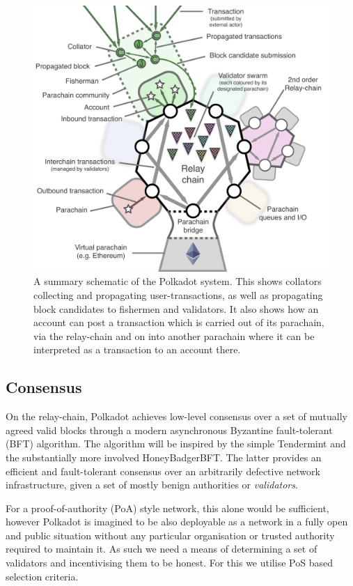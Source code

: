 \documentclass[9pt,oneside]{amsart}
\begin{document}
\begin{multicols}{2}
\begin{figure}
\includegraphics[width=12cm]{Overall.pdf}
\caption{A summary schematic of the Polkadot system. This shows collators collecting and propagating user-transactions, as well as propagating block candidates to fishermen and validators. It also shows how an account can post a transaction which is carried out of its parachain, via the relay-chain and on into another parachain where it can be interpreted as a transaction to an account there.}
\end{figure}

\subsection{Consensus}\label{consensus}

 On the relay-chain, Polkadot achieves low-level consensus over a set of mutually agreed valid blocks through a modern asynchronous Byzantine fault-tolerant (BFT) algorithm. The algorithm will be inspired by the simple Tendermint\cite{kwon2014tendermint} and the substantially more involved HoneyBadgerBFT\cite{miller2016honey}. The latter provides an efficient and fault-tolerant consensus over an arbitrarily defective network infrastructure, given a set of mostly benign authorities or \emph{validators}.

 For a proof-of-authority (PoA) style network, this alone would be sufficient, however Polkadot is imagined to be also deployable as a network in a fully open and public situation without any particular organisation or trusted authority required to maintain it. As such we need a means of determining a set of validators and incentivising them to be honest. For this we utilise PoS based selection criteria.


\end{multicols}
\end{document}
